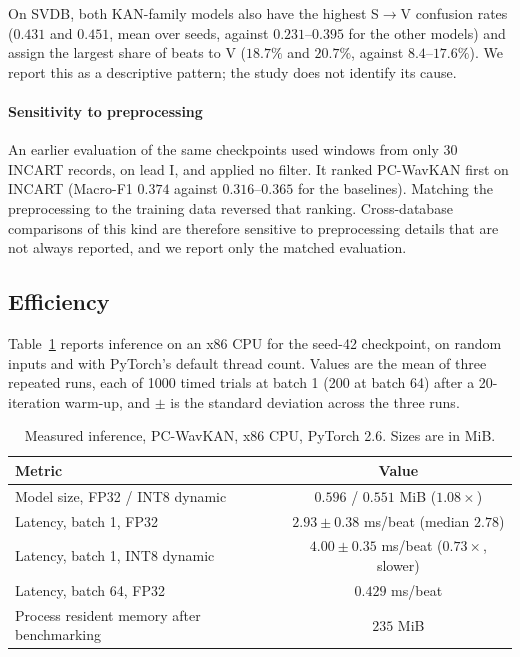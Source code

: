 \documentclass[preprint,12pt]{elsarticle}
\begin{document}
On SVDB, both KAN-family models also have the highest S$\rightarrow$V confusion rates ($0.431$ and $0.451$, mean over seeds, against $0.231$--$0.395$ for the other models) and assign the largest share of beats to V ($18.7\%$ and $20.7\%$, against $8.4$--$17.6\%$). We report this as a descriptive pattern; the study does not identify its cause.

\paragraph{Sensitivity to preprocessing} An earlier evaluation of the same checkpoints used windows from only 30 INCART records, on lead I, and applied no filter. It ranked PC-WavKAN first on INCART (Macro-F1 $0.374$ against $0.316$--$0.365$ for the baselines). Matching the preprocessing to the training data reversed that ranking. Cross-database comparisons of this kind are therefore sensitive to preprocessing details that are not always reported, and we report only the matched evaluation.

\subsection{Efficiency}
\label{sec:results_deploy}
Table~\ref{tab:deployment} reports inference on an x86 CPU for the seed-42 checkpoint, on random inputs and with PyTorch's default thread count. Values are the mean of three repeated runs, each of 1000 timed trials at batch 1 (200 at batch 64) after a 20-iteration warm-up, and $\pm$ is the standard deviation across the three runs.

\begin{table}[!htbp]
\centering
\caption{Measured inference, PC-WavKAN, x86 CPU, PyTorch 2.6. Sizes are in MiB.}
\label{tab:deployment}
\footnotesize
\begin{tabular}{l c}
\toprule
\textbf{Metric} & \textbf{Value} \\ \midrule
Model size, FP32 / INT8 dynamic & $0.596$ / $0.551$ MiB ($1.08\times$) \\
Latency, batch 1, FP32 & $2.93\pm0.38$ ms/beat (median $2.78$) \\
Latency, batch 1, INT8 dynamic & $4.00\pm0.35$ ms/beat ($0.73\times$, slower) \\
Latency, batch 64, FP32 & $0.429$ ms/beat \\
Process resident memory after benchmarking & $235$ MiB \\ \bottomrule
\end{tabular}
\end{table}
\end{document}
